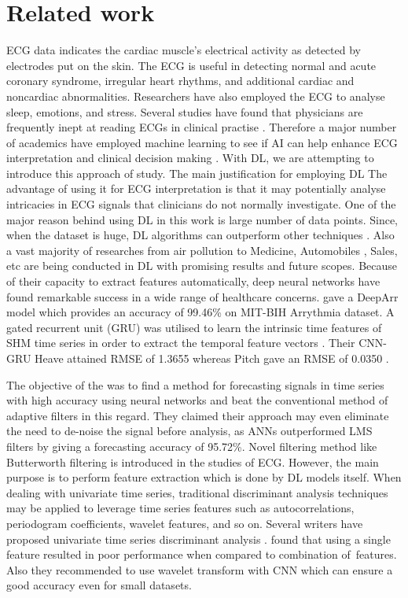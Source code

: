 \documentclass[a4paper, fleqn]{cas-sc}
\begin{document}
\section{Related work}
ECG data indicates the cardiac muscle's electrical activity as detected by electrodes put on the skin. The ECG is useful in detecting normal and acute coronary syndrome,  irregular heart rhythms,  and additional cardiac and noncardiac abnormalities. Researchers have also employed the ECG to analyse sleep,  emotions,  and stress. Several studies have found that physicians are frequently inept at reading ECGs in clinical practise \cite{bond2012effects}. Therefore a major number of academics have employed machine learning to see if AI can help enhance ECG interpretation and clinical decision making \cite{rjoob2022machine}. With DL,  we are attempting to introduce this approach of study. The main justification for employing DL The advantage of using it for ECG interpretation is that it may potentially analyse intricacies in ECG signals that clinicians do not normally investigate. One of the major reason behind using DL in this work is large number of data points. Since,  when the dataset is huge, DL algorithms can outperform other techniques \cite{purushotham2018benchmarking}. Also a vast majority of researches from air pollution \cite{kumar2022deep} to Medicine,  Automobiles \cite{naqvi2018deep},  Sales\cite{kaneko2016deep},  etc are being conducted in DL with promising results and future scopes.  Because of their capacity to extract features automatically,  deep neural networks have found remarkable success in a wide range of healthcare concerns. \cite{midani2023deeparr} gave a DeepArr model which provides an accuracy of 99.46\% on MIT-BIH Arrythmia dataset. A gated recurrent unit (GRU) was utilised to learn the intrinsic time features of SHM time series in order to extract the temporal feature vectors \cite{li2022hybrid}. Their CNN-GRU Heave attained RMSE of 1.3655 whereas Pitch gave an RMSE of 0.0350 . 
\par The objective of the \cite{prakarsha2022time} was to find a method for forecasting signals in time series with high accuracy using neural networks and beat the conventional method of adaptive filters in this regard. They claimed their approach may even eliminate the need to de-noise the signal before analysis,  as ANNs outperformed LMS filters by giving a forecasting accuracy of 95.72\%. Novel filtering method like Butterworth filtering is introduced in the studies of ECG. However,  the main purpose is to perform feature extraction which is done by DL models itself. When dealing with univariate time series,  traditional discriminant analysis techniques may be applied to leverage time series features such as autocorrelations,  periodogram coefficients,  wavelet features,  and so on. Several writers have proposed univariate time series discriminant analysis \cite{maharaj2007discrimination}. \cite{hammad2021automated} found that using a single feature resulted in poor performance when compared to combination of features. Also they recommended to use wavelet transform with CNN which can ensure a good accuracy even for small datasets. 
\end{document}
